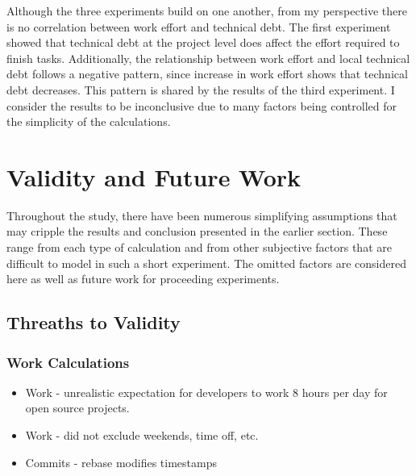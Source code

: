 \documentclass{mpaper}
\begin{document}
Although the three experiments build on one another, from my perspective there
is no correlation between work effort and technical debt. The first experiment
showed that technical debt at the project level does affect the effort required
to finish tasks. Additionally, the relationship between work effort and local
technical debt follows a negative pattern, since increase in work effort shows
that technical debt decreases. This pattern is shared by the results of the
third experiment. I consider the results to be inconclusive due to many factors
being controlled for the simplicity of the calculations.

\section{Validity and Future Work}
\label{validity-future-work}

Throughout the study, there have been numerous simplifying assumptions that may
cripple the results and conclusion presented in the earlier section. These range
from each type of calculation and from other subjective factors that are
difficult to model in such a short experiment. The omitted factors are
considered here as well as future work for proceeding experiments.

\subsection{Threaths to Validity}
\label{validity}

\subsubsection*{Work Calculations}
\label{validity-work}

\begin{itemize}
  \item Work - unrealistic expectation for developers to work 8 hours per day
  for open source projects.
  \item Work - did not exclude weekends, time off, etc.
  \item Commits - rebase modifies timestamps
\end{itemize}

\end{document}

